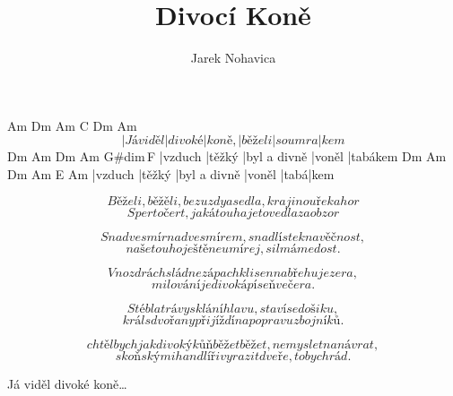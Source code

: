 \documentclass{song}
\title{Divocí Koně}
\author{Jarek Nohavica}
\begin{document}
\strophe
   Am        Dm      Am     C       Dm     Am
\[ |Já viděl |divoké |koně, |běželi |soumra|kem \]
Dm      Am     Dm           Am     G\#dim\,F
|vzduch |těžký |byl a divně |voněl |tabákem
Dm      Am     Dm           Am     E\7  Am
|vzduch |těžký |byl a divně |voněl |tabá|kem
\endstrophe

\strophe*
\[ Běželi, běžěli, bez uzdy a sedla,krajinou řek a hor \]
\[ Sper to čert, jaká touha je to vedla za obzor \]
\endstrophe

\strophe*
\[ Snad vesmír nad vesmírem, snad lístek na věčnost, \]
\[ naše touho ještě neumírej, sil máme dost. \]
\endstrophe

\strophe*
\[ V nozdrách sládne zápach klisen na břehu jezera, \]
\[ milování je divoká píseň večera. \]
\endstrophe

\strophe*
\[ Stébla trávy sklání hlavu , staví se do šiku, \]
\[ král s dvořany přijíždí na popravu zbojníků. \]
\endstrophe

\strophe*
\[ chtěl bych jak divoký kůň běžet běžet, nemyslet na návrat, \]
\[ s koňskými handlíři vyrazit dveře, to bych rád. \]
\endstrophe

Já viděl divoké koně\ldots
\end{document}
